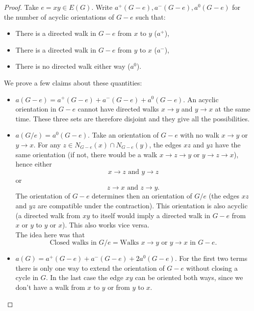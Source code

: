 \begin{proof}
Take $e=xy \in E(G)$. Write $a^+(G-e),a^-(G-e),a^0(G-e)$ for the number of acyclic orientations of $G-e$ such that:
\begin{itemize}
\item There is a directed walk in $G-e$ from $x$ to $y$ ($a^+$),
\item There is a directed walk in $G-e$ from $y$ to $x$ ($a^-$),
\item There is no directed walk either way ($a^0$).
\end{itemize}

We prove a few claims about these quantities:
\begin{itemize} 
\item $a(G-e)=a^+(G-e)+a^-(G-e)+a^0(G-e)$. 
An acyclic orientation in $G-e$ cannot have directed walks $x\longrightarrow y$ and $y\longrightarrow x$ at the same time. These three sets are therefore disjoint and they give all the possibilities.

\item $a(G/e)=a^0(G-e)$. 
Take an orientation of $G-e$ with no walk $x\longrightarrow y$ or $y\longrightarrow x$. For any $z\in N_{G-e}(x)\cap N_{G-e}(y)$, the edges $xz$ and $yz$ have the same orientation (if not, there would be a walk $x\longrightarrow z\longrightarrow y$ or $y\longrightarrow z\longrightarrow x$), hence either  
$$x\longrightarrow z \text{ and } y\longrightarrow z$$
or
$$z\longrightarrow x \text{ and } z\longrightarrow y.$$
The orientation of $G-e$ determines then an orientation of $G/e$ (the edges $xz$ and $yz$ are compatible under the contraction). This orientation is also acyclic (a directed walk from $xy$ to itself would imply a directed walk in $G-e$ from $x$ or $y$ to $y$ or $x$). This also works vice versa.
\\ The idea here was that 
$$\text{Closed walks in } G/e = \text{Walks } x\longrightarrow y \text{ or } y\longrightarrow x \text { in } G-e.$$

\item $a(G)=a^+(G-e)+a^-(G-e)+2a^0(G-e)$. 
For the first two terms there is only one way to extend the orientation of $G-e$ without closing a cycle in $G$. In the last case the edge $xy$ can be oriented both ways, since we don't have a walk from $x$ to $y$ or from $y$ to $x$.
\end{itemize}


\end{proof}
